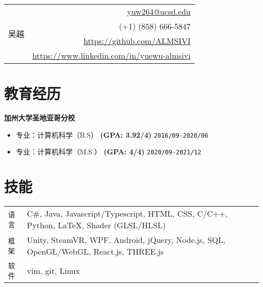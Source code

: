 \documentclass[10pt, letterpaper]{ctexart}
\begin{document}
	\begin{tabularx}{\linewidth}{X r}
		\multirow{5}{*}{{\fontsize{50}{60}\selectfont 吴越}}
		& \href{mailto:yuw264@ucsd.edu}{yuw264@ucsd.edu} \\
		& (+1) (858) 666-5847 \\
		& \href{https://github.com/ALMSIVI}{https://github.com/ALMSIVI} \\
		& \href{https://www.linkedin.com/in/yuewu-almsivi}{https://www.linkedin.com/in/yuewu-almsivi}
	\end{tabularx}
	\section{教育经历}
	\smallskip
	\textbf{\large 加州大学圣地亚哥分校}
	\begin{itemize}
		\item 专业：计算机科学（B.S） \textbf{(GPA: 3.92/4)} \hfill \texttt{2016/09-2020/06}
		\item 专业：计算机科学（M.S.） \textbf{(GPA: 4/4)} \hfill \texttt{2020/09-2021/12}
	\end{itemize}
	\section{技能}
	\smallskip
	\begin{tabularx}{\linewidth}{l X}
		\texttt{语言} & C\#, Java, Javascript/Typescript, HTML, CSS, C/C++, Python, \LaTeX, Shader (GLSL/HLSL) \\
		\texttt{框架} & Unity, SteamVR, WPF, Android, jQuery, Node.js, SQL, OpenGL/WebGL, React.js, THREE.js \\
		\texttt{软件} & vim, git, Linux
	\end{tabularx}
\end{document}
